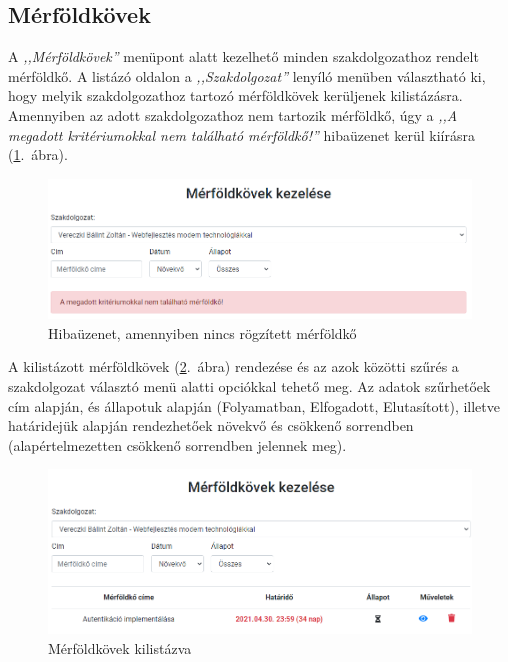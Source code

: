 \documentclass[
]{thesis-ekf}
\theoremstyle{definition}
\theoremstyle{remark}
\begin{document}
	\subsection{Mérföldkövek}
	A \emph{,,Mérföldkövek''} menüpont alatt kezelhető minden szakdolgozathoz rendelt mérföldkő. A listázó oldalon a \emph{,,Szakdolgozat''} lenyíló menüben választható ki, hogy melyik szakdolgozathoz tartozó mérföldkövek kerüljenek kilistázásra. Amennyiben az adott szakdolgozathoz nem tartozik mérföldkő, úgy a \emph{,,A megadott kritériumokkal nem található mérföldkő!''} hibaüzenet kerül kiírásra (\ref{fig:oktato_merfoldko_lista_nincs}.~ábra).
	
	\begin{figure}[!h]
		\centering
		\includegraphics[width=12cm]{kepek/screenshots/oktato_merfoldko_lista_nincs.png}
		\caption{Hibaüzenet, amennyiben nincs rögzített mérföldkő}
		\label{fig:oktato_merfoldko_lista_nincs}
	\end{figure}
	
	A kilistázott mérföldkövek (\ref{fig:oktato_merfoldko_lista}.~ábra) rendezése és az azok közötti szűrés a szakdolgozat választó menü alatti opciókkal tehető meg. Az adatok szűrhetőek cím alapján, és állapotuk alapján (Folyamatban, Elfogadott, Elutasított), illetve határidejük alapján rendezhetőek növekvő és csökkenő sorrendben (alapértelmezetten csökkenő sorrendben jelennek meg). 
	
	\begin{figure}[!h]
		\centering
		\includegraphics[width=12cm]{kepek/screenshots/oktato_merfoldko_lista.png}
		\caption{Mérföldkövek kilistázva}
		\label{fig:oktato_merfoldko_lista}
	\end{figure}
	
\end{document}
